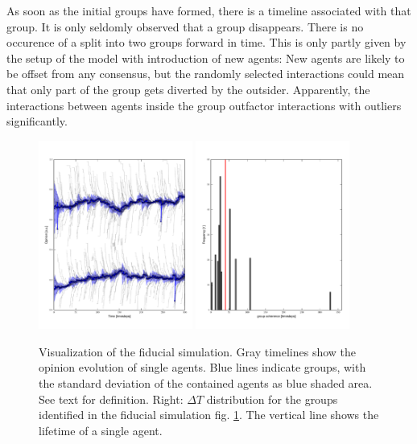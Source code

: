 \documentclass[useAMS,usenatbib]{templates/mn2e}
\begin{document}
As soon as the initial groups have formed, there is a timeline
associated with that group. It is only seldomly observed that a group
disappears. There is no occurence of a split into two
groups forward in time. This is only partly given by the setup of the model with
introduction of new agents: New agents are likely to be offset from
any consensus, but the randomly selected interactions could mean that
only part of the group gets diverted by the outsider. Apparently, the
interactions between agents inside the group outfactor interactions
with outliers significantly.

\begin{figure}
  \begin{center}
    \includegraphics[width=0.45\textwidth]{fig/fiducial.pdf}
    \includegraphics[width=0.45\textwidth]{fig/fiducial_var.pdf}
  \end{center}
  \caption{\label{fig:fiducial} Visualization of the fiducial
    simulation. Gray timelines show the opinion evolution of single
    agents. Blue lines indicate groups, with the standard deviation of
    the contained agents as blue shaded area. See text for definition.
    Right: $\Delta T$ distribution for the groups
    identified in the fiducial simulation fig. \ref{fig:fiducial}. The
    vertical line shows the lifetime of a single agent.}
\end{figure}
\end{document}
